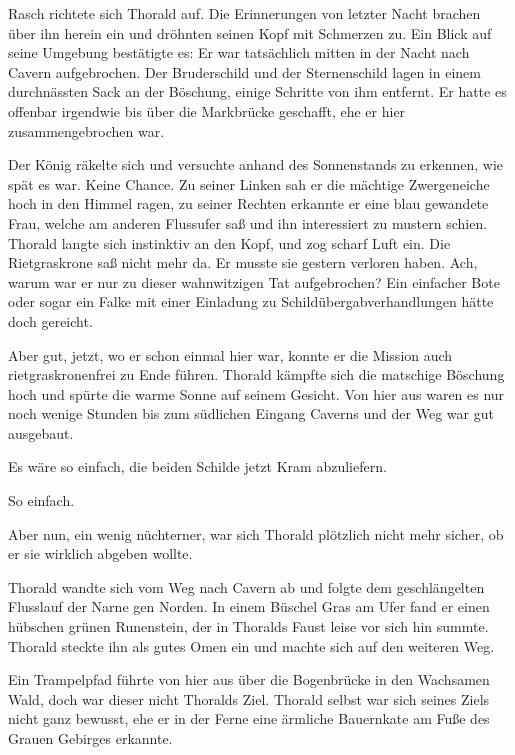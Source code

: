 \documentclass[10pt, a4paper, oneside]{book}
\begin{document}
Rasch richtete sich Thorald auf. Die Erinnerungen von letzter Nacht brachen über ihn herein ein und dröhnten seinen Kopf mit Schmerzen zu. Ein Blick auf seine Umgebung bestätigte es: Er war tatsächlich mitten in der Nacht nach Cavern aufgebrochen. Der Bruderschild und der Sternenschild lagen in einem durchnässten Sack an der Böschung, einige Schritte von ihm entfernt. Er hatte es offenbar irgendwie bis über die Markbrücke geschafft, ehe er hier zusammengebrochen war.

Der König räkelte sich und versuchte anhand des Sonnenstands zu erkennen, wie spät es war. Keine Chance. Zu seiner Linken sah er die mächtige Zwergeneiche hoch in den Himmel ragen, zu seiner Rechten erkannte er eine blau gewandete Frau, welche am anderen Flussufer saß und ihn interessiert zu mustern schien. Thorald langte sich instinktiv an den Kopf, und zog scharf Luft ein. Die Rietgraskrone saß nicht mehr da. Er musste sie gestern verloren haben. Ach, warum war er nur zu dieser wahnwitzigen Tat aufgebrochen? Ein einfacher Bote oder sogar ein Falke mit einer Einladung zu Schildübergabverhandlungen hätte doch gereicht.

Aber gut, jetzt, wo er schon einmal hier war, konnte er die Mission auch rietgraskronenfrei zu Ende führen. Thorald kämpfte sich die matschige Böschung hoch und spürte die warme Sonne auf seinem Gesicht. Von hier aus waren es nur noch wenige Stunden bis zum südlichen Eingang Caverns und der Weg war gut ausgebaut.

Es wäre so einfach, die beiden Schilde jetzt Kram abzuliefern.

So einfach.

Aber nun, ein wenig nüchterner, war sich Thorald plötzlich nicht mehr sicher, ob er sie wirklich abgeben wollte.\bigskip







Thorald wandte sich vom Weg nach Cavern ab und folgte dem geschlängelten Flusslauf der Narne gen Norden. In einem Büschel Gras am Ufer fand er einen hübschen grünen Runenstein, der in Thoralds Faust leise vor sich hin summte. Thorald steckte ihn als gutes Omen ein und machte sich auf den weiteren Weg.

Ein Trampelpfad führte von hier aus über die Bogenbrücke in den Wachsamen Wald, doch war dieser nicht Thoralds Ziel. Thorald selbst war sich seines Ziels nicht ganz bewusst, ehe er in der Ferne eine ärmliche Bauernkate am Fuße des Grauen Gebirges erkannte.
\end{document}
